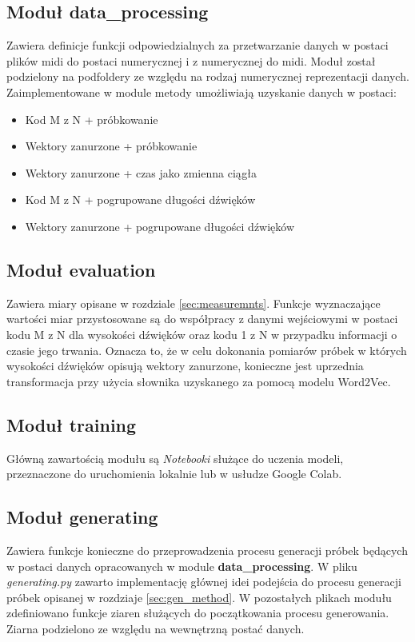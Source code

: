 {{        \subsection{Moduł data\_processing}
        {
            Zawiera definicje funkcji odpowiedzialnych za przetwarzanie danych w postaci plików midi do postaci numerycznej i z numerycznej do midi. Moduł został podzielony na podfoldery ze względu na rodzaj numerycznej reprezentacji danych. Zaimplementowane w module metody umożliwiają uzyskanie danych w postaci:
            \begin{itemize}
                \setlength\itemsep{-0.5em}
                \item Kod  M\,\,z\,\,N + próbkowanie
                \item Wektory zanurzone + próbkowanie
                \item Wektory zanurzone + czas jako zmienna ciągła
                \item Kod  M\,\,z\,\,N + pogrupowane długości dźwięków
                \item Wektory zanurzone + pogrupowane długości dźwięków
            \end{itemize}


        }

        \subsection{Moduł evaluation}
        {
            Zawiera miary opisane w rozdziale \ref{sec:measuremnts}. Funkcje wyznaczające wartości miar przystosowane są do współpracy z danymi wejściowymi w postaci kodu M\,\,z\,\,N dla wysokości dźwięków oraz kodu 1\,\,z\,\,N w przypadku informacji o czasie jego trwania. Oznacza to, że w celu dokonania pomiarów próbek w których wysokości dźwięków opisują wektory zanurzone, konieczne jest uprzednia transformacja przy użycia słownika uzyskanego za pomocą modelu Word2Vec.
        }

        \subsection{Moduł training}
        {
            Główną zawartością modułu są {\textit {Notebooki}} służące do uczenia modeli, przeznaczone do uruchomienia lokalnie lub w usłudze Google Colab. 
        }

        \subsection{Moduł generating}
        {
            Zawiera funkcje konieczne do przeprowadzenia procesu generacji próbek będących w postaci danych opracowanych w module {\textbf {data\_processing}}. W pliku {\textit {generating.py}} zawarto implementację głównej idei podejścia do procesu generacji próbek opisanej w rozdziaje \ref{sec:gen_method}. W pozostałych plikach modułu zdefiniowano funkcje ziaren służących do początkowania procesu generowania. Ziarna podzielono ze względu na wewnętrzną postać danych.
        }

}}

